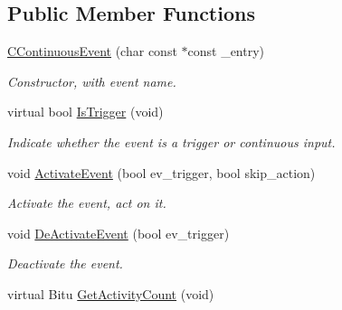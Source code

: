 \subsection*{Public Member Functions}
\begin{DoxyCompactItemize}
\item 
\hypertarget{classCContinuousEvent_ac998a6e07ae19db1bd6000b26f3b2a56}{\hyperlink{classCContinuousEvent_ac998a6e07ae19db1bd6000b26f3b2a56}{C\-Continuous\-Event} (char const $\ast$const \-\_\-entry)}\label{classCContinuousEvent_ac998a6e07ae19db1bd6000b26f3b2a56}

\begin{DoxyCompactList}\small\item\em Constructor, with event name. \end{DoxyCompactList}\item 
\hypertarget{classCContinuousEvent_a7d1e187b39ea746e8aabf70d7c176d4f}{virtual bool \hyperlink{classCContinuousEvent_a7d1e187b39ea746e8aabf70d7c176d4f}{Is\-Trigger} (void)}\label{classCContinuousEvent_a7d1e187b39ea746e8aabf70d7c176d4f}

\begin{DoxyCompactList}\small\item\em Indicate whether the event is a trigger or continuous input. \end{DoxyCompactList}\item 
\hypertarget{classCContinuousEvent_a3b2815847a046746c02c8a2841aa2bfb}{void \hyperlink{classCContinuousEvent_a3b2815847a046746c02c8a2841aa2bfb}{Activate\-Event} (bool ev\-\_\-trigger, bool skip\-\_\-action)}\label{classCContinuousEvent_a3b2815847a046746c02c8a2841aa2bfb}

\begin{DoxyCompactList}\small\item\em Activate the event, act on it. \end{DoxyCompactList}\item 
\hypertarget{classCContinuousEvent_a025ebb767d3d067f52fb342126627c6d}{void \hyperlink{classCContinuousEvent_a025ebb767d3d067f52fb342126627c6d}{De\-Activate\-Event} (bool ev\-\_\-trigger)}\label{classCContinuousEvent_a025ebb767d3d067f52fb342126627c6d}

\begin{DoxyCompactList}\small\item\em Deactivate the event. \end{DoxyCompactList}\item 
\hypertarget{classCContinuousEvent_a3185a87873f79aea8c23054b55c1ceac}{virtual Bitu \hyperlink{classCContinuousEvent_a3185a87873f79aea8c23054b55c1ceac}{Get\-Activity\-Count} (void)}\label{classCContinuousEvent_a3185a87873f79aea8c23054b55c1ceac}


\end{DoxyCompactItemize}
